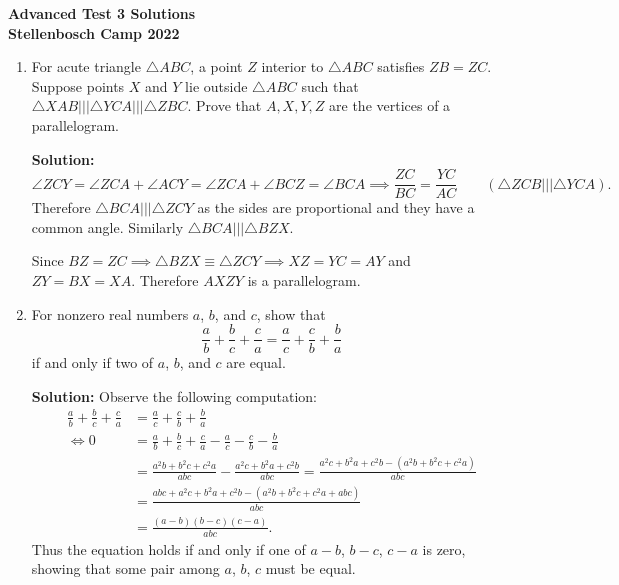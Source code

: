 \documentclass{article}
\begin{document}
\thispagestyle{empty}

\begin{center} \bfseries
  \Large Advanced Test 3 Solutions
  \\ \vspace{12pt}
  \large Stellenbosch Camp 2022
\end{center}

\bigskip \bigskip

\begin{enumerate}[itemsep=24pt]

\item 
For acute triangle $\triangle ABC$, a point $Z$ interior to $\triangle ABC$ satisfies $ZB = ZC$.
Suppose points $X$ and $Y$ lie outside $\triangle ABC$ such that $\triangle XAB \mathrel{|||} \triangle YCA \mathrel{|||} \triangle ZBC$.
Prove that $A,X,Y,Z$ are the vertices of a parallelogram. 

\textbf{Solution:}
$$\angle ZCY = \angle ZCA + \angle ACY = \angle ZCA + \angle BCZ = \angle BCA \implies \frac{ZC}{BC} = \frac{YC}{AC} \qquad (\triangle ZCB \mathrel{|||} \triangle YCA).$$
Therefore $\triangle BCA \mathrel{|||} \triangle ZCY$ as the sides are proportional and they have a common angle. Similarly $\triangle BCA \mathrel{|||} \triangle BZX$. 

Since $BZ = ZC \implies \triangle BZX \equiv \triangle ZCY \implies XZ = YC = AY$ and $ZY = BX = XA$.
Therefore $AXZY$ is a parallelogram.


\item %
For nonzero real numbers $a$, $b$, and $c$, show that
\[ \frac{a}{b} +\frac{b}{c} +\frac{c}{a} = \frac{a}{c} +\frac{c}{b} +\frac{b}{a} \]
if and only if two of $a$, $b$, and $c$ are equal.

\textbf{Solution:} Observe the following computation:
\begin{align*}
  \frac{a}{b} +\frac{b}{c} +\frac{c}{a} &= \frac{a}{c} +\frac{c}{b} +\frac{b}{a} \\
  \iff 0 &= \frac{a}{b} +\frac{b}{c} +\frac{c}{a} -\frac{a}{c} -\frac{c}{b} -\frac{b}{a} \\
  &= \frac{a^{2}b + b^{2}c + c^{2}a}{abc} -\frac{a^{2}c + b^{2}a + c^{2}b}{abc} = \frac{a^{2}c + b^{2}a + c^{2}b -(a^{2}b + b^{2}c + c^{2}a)}{abc} \\
  &= \frac{abc + a^{2}c + b^{2}a + c^{2}b - (a^{2}b + b^{2}c + c^{2}a+abc)}{abc} \\
  &= \frac{(a-b)(b-c)(c-a)}{abc}.
\end{align*}
Thus the equation holds if and only if one of $a-b$, $b-c$, $c-a$ is zero, showing that some pair among $a$, $b$, $c$ must be equal.



\end{enumerate}
\end{document}
